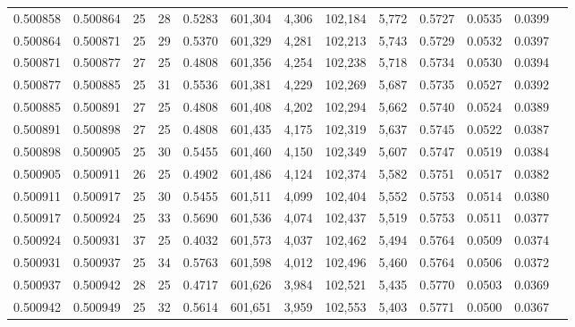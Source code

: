 \begin{tabular}{rrrrrrrrrrrrr}
0.500858 & 0.500864 &    25 &  28 &                                     0.5283 & 601,304 &   4,306 & 102,184 &   5,772 & 0.5727 & 0.0535 & 0.0399 \\
0.500864 & 0.500871 &    25 &  29 &                                     0.5370 & 601,329 &   4,281 & 102,213 &   5,743 & 0.5729 & 0.0532 & 0.0397 \\
0.500871 & 0.500877 &    27 &  25 &                                     0.4808 & 601,356 &   4,254 & 102,238 &   5,718 & 0.5734 & 0.0530 & 0.0394 \\
0.500877 & 0.500885 &    25 &  31 &                                     0.5536 & 601,381 &   4,229 & 102,269 &   5,687 & 0.5735 & 0.0527 & 0.0392 \\
0.500885 & 0.500891 &    27 &  25 &                                     0.4808 & 601,408 &   4,202 & 102,294 &   5,662 & 0.5740 & 0.0524 & 0.0389 \\
0.500891 & 0.500898 &    27 &  25 &                                     0.4808 & 601,435 &   4,175 & 102,319 &   5,637 & 0.5745 & 0.0522 & 0.0387 \\
0.500898 & 0.500905 &    25 &  30 &                                     0.5455 & 601,460 &   4,150 & 102,349 &   5,607 & 0.5747 & 0.0519 & 0.0384 \\
0.500905 & 0.500911 &    26 &  25 &                                     0.4902 & 601,486 &   4,124 & 102,374 &   5,582 & 0.5751 & 0.0517 & 0.0382 \\
0.500911 & 0.500917 &    25 &  30 &                                     0.5455 & 601,511 &   4,099 & 102,404 &   5,552 & 0.5753 & 0.0514 & 0.0380 \\
0.500917 & 0.500924 &    25 &  33 &                                     0.5690 & 601,536 &   4,074 & 102,437 &   5,519 & 0.5753 & 0.0511 & 0.0377 \\
0.500924 & 0.500931 &    37 &  25 &                                     0.4032 & 601,573 &   4,037 & 102,462 &   5,494 & 0.5764 & 0.0509 & 0.0374 \\
0.500931 & 0.500937 &    25 &  34 &                                     0.5763 & 601,598 &   4,012 & 102,496 &   5,460 & 0.5764 & 0.0506 & 0.0372 \\
0.500937 & 0.500942 &    28 &  25 &                                     0.4717 & 601,626 &   3,984 & 102,521 &   5,435 & 0.5770 & 0.0503 & 0.0369 \\
0.500942 & 0.500949 &    25 &  32 &                                     0.5614 & 601,651 &   3,959 & 102,553 &   5,403 & 0.5771 & 0.0500 & 0.0367 \\

\end{tabular}
